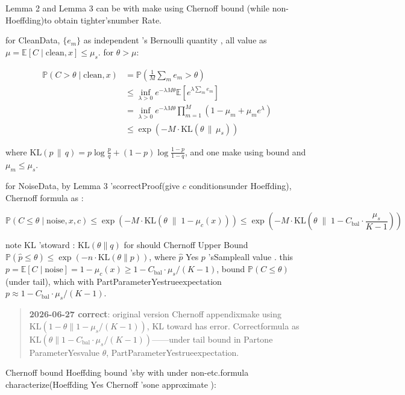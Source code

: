 \documentclass[
  12pt,
]{article}
\begin{document}
Lemma 2 and  Lemma 3 can be with make using  Chernoff bound (while non-
Hoeffding)to obtain tighter'snumber Rate. 

for CleanData,  \(\{e_m\}\) as independent 's Bernoulli quantity , all value as 
\(\mu = \mathbb{E}[C \mid \text{clean}, x] \leq \mu_s\). for 
\(\theta > \mu\): 

\[\begin{aligned}
\mathbb{P}(C > \theta \mid \text{clean}, x) 
&= \mathbb{P}\!\left(\frac{1}{M}\sum_m e_m > \theta\right) \\
&\leq \inf_{\lambda > 0} e^{-\lambda M\theta} \mathbb{E}\!\left[e^{\lambda\sum_m e_m}\right] \\
&= \inf_{\lambda > 0} e^{-\lambda M\theta} \prod_{m=1}^M (1 - \mu_m + \mu_m e^\lambda) \\
&\leq \exp\!\left(-M \cdot \text{KL}(\theta \,\|\, \mu_s)\right)
\end{aligned}\]

where
\(\text{KL}(p \,\|\, q) = p\log\frac{p}{q} + (1-p)\log\frac{1-p}{1-q}\), and one make using bound and 
\(\mu_m \leq \mu_s\). 

for NoiseData, by  Lemma 3 'scorrectProof(give  \(c\) conditionsunder 
Hoeffding), Chernoff formula as : 

\[\mathbb{P}(C \leq \theta \mid \text{noise}, x, c) \leq \exp\!\left(-M \cdot \text{KL}\!\left(\theta \;\Big\|\; 1 - \mu_c(x)\right)\right) \leq \exp\!\left(-M \cdot \text{KL}\!\left(\theta \;\Big\|\; 1 - C_{\text{bal}} \cdot \frac{\mu_s}{K-1}\right)\right)\]

note KL 'stoward : \(\text{KL}(\theta \| q)\) for should  Chernoff Upper Bound
\(\mathbb{P}(\hat{p} \leq \theta) \leq \exp(-n \cdot \text{KL}(\theta \| p))\), where
\(\hat{p}\) Yes \(p\) 'sSampleall value . this 
\(p = \mathbb{E}[C \mid \text{noise}] = 1 - \mu_c(x) \geq 1 - C_{\text{bal}} \cdot \mu_s/(K-1)\), 
bound \(\mathbb{P}(C \leq \theta)\)(under tail), which with PartParameterYestrueexpectation
\(p \approx 1 - C_{\text{bal}} \cdot \mu_s/(K-1)\). 

\begin{quote}
\textbf{2026-06-27 correct}: original version Chernoff appendixmake using 
\(\text{KL}(1-\theta \| 1 - \mu_s/(K-1))\), KL toward has error. Correctformula as 
\(\text{KL}(\theta \| 1 - C_{\text{bal}} \cdot \mu_s/(K-1))\)------under tail
bound in Partone ParameterYesvalue  \(\theta\), PartParameterYestrueexpectation. 
\end{quote}

Chernoff bound  Hoeffding bound 'sby with under non-etc.formula characterize(Hoeffding Yes
Chernoff 'sone approximate ):
\end{document}
